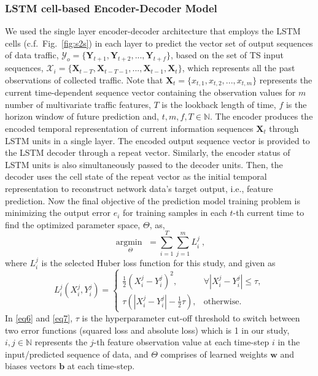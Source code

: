 \documentclass[10pt, conference]{IEEEtran}
\newcommand{\fakeparagraph}[1]{\vspace{.1mm}\noindent\textbf{#1}}
\newcommand{\fakepar}[1]{\fakeparagraph{#1}}
\begin{document}
\subsubsection{LSTM cell-based Encoder-Decoder Model}
We used the single layer encoder-decoder architecture that employs the LSTM cells (c.f.~Fig.~\ref{fig:s2s}) in each layer to predict the vector set of output sequences of data traffic, $\mathcal{Y}_o=\{\mathbf{Y}_{t+1},\mathbf{Y}_{t+2},...,\mathbf{Y}_{t+f}\}$, based on the set of TS input sequences, $\mathcal{X}_i=\{\mathbf{X}_{t-T},\mathbf{X}_{t-T-1},...,\mathbf{X}_{t-1},\mathbf{X}_{t}\}$, which represents all the past observations of collected traffic. Note that $\mathbf{X}_{t}=\{x_{t,1}, x_{t,2},...,x_{t,m}\}$ represents the current time-dependent sequence vector containing the observation values for $m$ number of multivariate traffic features, $T$ is the lookback length of time, $f$ is the horizon window of future prediction and, $t,m,f,T \in \mathbb{N}$. 
The encoder produces the encoded temporal representation of current information sequences $\mathbf{X}_{t}$ through LSTM units in a single layer. The encoded output sequence vector is provided to the LSTM decoder through a repeat vector. Similarly, the encoder status of LSTM units is also simultaneously passed to the decoder units. Then, the decoder uses the cell state of the repeat vector as the initial temporal representation to reconstruct network data's target output, i.e., feature prediction. 
Now the final objective of the prediction model training problem is minimizing the output error $e_i$ for training samples in each $t$-th current time to find the optimized parameter space, $\Theta$, as,
\begin{equation}\label{eq6}
\mathop {\arg \min \: {e_i}}\limits_\Theta   = \sum\limits_{i = 1}^T {\sum\limits_{j = 1}^m {L_i^j} } \:,
\end{equation}
where $L_i^j$ is the selected Huber loss function for this study, and given as
\begin{equation}\label{eq7}
L_i^j\!\left( {X_i^j,Y_i^j} \right) \!\! = \!\! \left\{\!\! {\begin{array}{*{20}{c}}
{\frac{1}{2}{{\left( {X_i^j - Y_i^j} \right)}^2},}&{\forall \left| {X_i^j - Y_i^j} \right| \le \tau ,}\\
{\tau \left( {\left| {X_i^j - Y_i^j} \right| - \frac{1}{2}\tau } \right),}&{\mathrm{otherwise}.}
\end{array}} \right.
\end{equation}
In \eqref{eq6} and \eqref{eq7}, $\tau$ is the hyperparameter cut-off threshold to switch between two error functions (squared loss and absolute loss) which is 1 in our study,  $i,j \in \mathbb{N}$ represents the $j$-th feature observation value at each time-step $i$ in the input/predicted sequence of data, and $\Theta$ comprises of learned weights $\mathbf{w}$ and biases vectors $\mathbf{b}$ at each time-step. 
\end{document}
